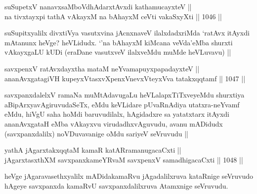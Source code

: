 
\begin{shl}
suSupetxV nanavxsaMboVdhAdarxtAvxdi kathamucayxteV || \\
na tivxtayxpi tathA vAkayxM na bAhayxM ceVti vakaSxyXti ||  1046 ||  
\end{shl}

\begin{artha}
suSupitxyalilx divxtiVya vasutxvina jAcnxnaveV ilalxdadxriMda `ratAvx itAyxdi mAtanunx heVge? heVLidudx. `\stext'na bAhayxM kiMcana veVda'eMba shurxti vAkayxgaLU kUDi (eraDane vasutxveV ilalxveMdu muMde heVLuvavu) ||
\end{artha}


\begin{shl}
savxpenxV ratAvxdayxtha mataM neYvamapuyxpapadayxteV || \\
ananAvxgatagiVH kupeyxVtasxvXpenxV\s nevxVteyxVva tatakxqqtamf ||  1047 ||  
\end{shl}

\begin{artha}
savxpanxdalelxV ramaNa muMtAdavugaLu heVLalapxTiTxveyeMdu shurxtiya aBipArxyavAgiruvudaSeTx, eMdu keVLidare pUvaRnAdiya utatxra-neYvamf eMdu, hiVgU saha hoMdi baruvudilalx, hAgidadxre sa yatatxtarx itAyxdi ananAvxgataH eMba vAkayxvu virudadhxvAguvudu, avanu mADidudx (savxpanxdalilx) noVDuvavanige oMdu sariyeV seVruvudu ||                                       
\end{artha}

\begin{shl}
yathA jAgarxtakxqqtaM kamaR katARramanugacaCxti || \\
jAgarxtasxthXM savxpanxkameYRvaM savxpenxV samadhigacaCxti ||  1048 ||  
\end{shl}


\begin{artha}
heVge jAgaravasethxyalilx mADidakamaRvu jAgadalilxruva kataRnige seVruvudo hAgeye savxpanxda kamaRvU savxpanxdalilxruva Atamxnige seVruvudu.
\end{artha}


